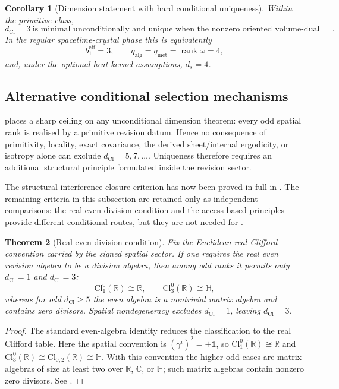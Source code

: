 \documentclass[11pt]{article}
\newtheorem{theorem}{Theorem}[section]
\newtheorem{corollary}[theorem]{Corollary}
\theoremstyle{definition}
\theoremstyle{remark}
\newcommand{\R}{\mathbb{R}}
\newcommand{\C}{\mathbb{C}}
\newcommand{\Cl}{\mathrm{Cl}}
\newcommand{\dCl}{d_{\mathrm{Cl}}}
\newcommand{\beff}{b_1^{\mathrm{eff}}}
\newcommand{\rank}{\operatorname{rank}}
\newcommand{\one}{\mathbf{1}}
\begin{document}
\begin{corollary}[Dimension statement with hard conditional uniqueness]
\label{cor:dimension-final-status}
Within the primitive class,
\[
  \boxed{\dCl=3\ \text{is minimal unconditionally and unique when the nonzero
  oriented volume-dual response closes into the elementary revision sector}.}
\]
In the regular spacetime-crystal phase this is equivalently
\[
  \beff=3,\qquad
  q_{\mathrm{alg}}=q_{\mathrm{met}}=\rank\omega=4,
\]
and, under the optional heat-kernel assumptions, \(d_s=4\).
\end{corollary}


\subsection{Alternative conditional selection mechanisms}
\label{subsec:native-selection-principles}

 places a sharp ceiling on any unconditional
dimension theorem: every odd spatial rank is realised by a primitive revision
datum.  Hence no consequence of primitivity, locality, exact covariance, the derived
sheet/internal ergodicity, or isotropy alone can exclude
$\dCl=5,7,\ldots$.  Uniqueness therefore requires an additional structural
principle formulated inside the revision sector.

The structural interference-closure criterion has now been proved in full in
.  The remaining criteria in this subsection
are retained only as independent comparisons: the real-even division condition
and the access-based principles provide different conditional routes, but they
are not needed for .

\begin{theorem}[Real-even division condition]
\label{thm:real-even-division-selects-three}
Fix the Euclidean real Clifford convention carried by the signed spatial sector.
If one requires the real even revision algebra to be a division algebra, then
among odd ranks it permits only $\dCl=1$ and $\dCl=3$:
\[
 \Cl_{1}^{0}(\R)\cong\R,
 \qquad
 \Cl_{3}^{0}(\R)\cong\mathbb H,
\]
whereas for odd $\dCl\ge5$ the even algebra is a nontrivial matrix algebra and
contains zero divisors.  Spatial nondegeneracy excludes $\dCl=1$, leaving
$\dCl=3$.
\end{theorem}

\begin{proof}
The standard even-algebra identity reduces the classification to the real
Clifford table.  Here the spatial convention is \((\gamma^i)^2=+\one\), so
\(\Cl_1^0(\R)\cong\R\) and
\(\Cl_3^0(\R)\cong\Cl_{0,2}(\R)\cong\mathbb H\).  With this convention the
higher odd cases are matrix algebras of size at least two over
$\R$, $\C$, or $\mathbb H$; such matrix algebras contain nonzero zero divisors.
See \cite{atiyah-bott-shapiro,lawson-michelsohn}.
\end{proof}
\end{document}
